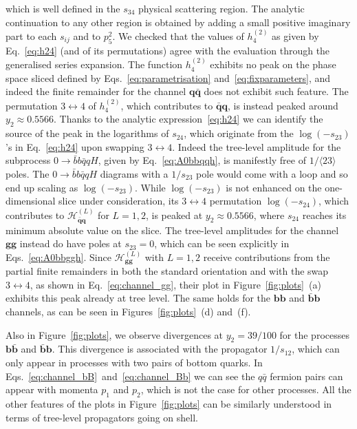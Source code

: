 \documentclass[main.tex]{subfiles}
\begin{document}
which is well defined in the $s_{34}$ physical scattering region. The analytic continuation to any other region is obtained by adding a small positive imaginary part to each $s_{ij}$ and to $p_5^2$. We checked that the values of $h^{(2)}_4$ as given by Eq.~\eqref{eq:h24} (and of its permutations) agree with the evaluation through the generalised series expansion. The function $h^{(2)}_4$ exhibits no peak on the phase space sliced defined by Eqs.~\eqref{eq:parametrisation} and~\eqref{eq:fixparameters}, and indeed the finite remainder for the channel $\mathbf{q\bar{q}}$ does not exhibit such feature. The permutation $3\leftrightarrow 4$ of $h^{(2)}_4$, which contributes to $\mathbf{\bar{q}q}$, is instead peaked around $y_2 \approx 0.5566$. Thanks to the analytic expression~\eqref{eq:h24} we can identify the source of the peak in the logarithms of $s_{24}$, which originate from the $\log (-s_{23})$'s in Eq.~\eqref{eq:h24} upon swapping $3\leftrightarrow 4$. Indeed the tree-level amplitude for the subprocess $0\to\bar{b} b \bar{q} q H$, given by Eq.~\eqref{eq:A0bbqqh}, is manifestly free of $1/\langle 23 \rangle$ poles. The $0\to\bar{b} b \bar{q} q H$ diagrams with a $1/s_{23}$ pole would come with a loop and so end up scaling as $\log(-s_{23})$. While $\log(-s_{23})$ is not enhanced on the one-dimensional slice under consideration, its $3\leftrightarrow4$ permutation $\log(-s_{24})$, which contributes to $\mathcal{H}^{(L)}_{\mathbf{\bar{q}q}}$ for $L=1,2$, is peaked at $y_2 \approx 0.5566$, where $s_{24}$ reaches its minimum absolute value on the slice. 
The tree-level amplitudes for the channel $\mathbf{gg}$ instead do have poles at $s_{23}=0$, which
can be seen explicitly in Eqs.~\eqref{eq:A0bbggh}. Since $\mathcal{H}^{(L)}_{\mathbf{gg}}$ with
$L=1,2$ receive contributions from the partial finite remainders in both the standard orientation
and with the swap $3\leftrightarrow4$, as shown in Eq.~\eqref{eq:channel_gg}, their plot in Figure~\ref{fig:plots}~(a) exhibits this peak already at tree level. The same holds for the $\mathbf{bb}$ and $\mathbf{\bar{b}b}$ channels, as can be seen in Figures~\ref{fig:plots}~(d) and~(f). 

Also in Figure~\ref{fig:plots}, we observe divergences at $y_2 = 39/100$ for the processes
$\mathbf{b\bar{b}}$ and $\mathbf{\bar{b}b}$. This divergence is associated with the propagator
$1/s_{12}$, which can only appear in processes with two pairs of bottom quarks. In Eqs.~\eqref{eq:channel_bB}~and~\eqref{eq:channel_Bb} 
we can see the $q\bar{q}$ fermion pairs can appear
with momenta $p_1$ and $p_2$, which is not the case for other processes. All the other features of the plots
in Figure~\ref{fig:plots} can be similarly understood in terms of tree-level propagators going on shell.
\end{document}
